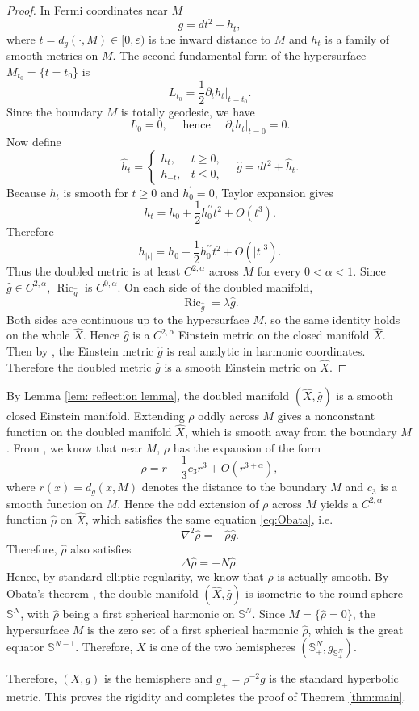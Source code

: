\documentclass[11pt,letterpaper]{amsart}
\theoremstyle{definition}
\theoremstyle{remark}
\numberwithin{equation}{section}
\newcommand{\Sph}{\mathbb S}
\newcommand{\Ric}{\operatorname{Ric}}
\begin{document}
\begin{proof}
In Fermi coordinates near $M$
\[
g=d t^2+h_t,
\]
where $t=d_g(\cdot, M) \in [0,\varepsilon)$ is the inward distance to $M$ and $h_t$ is a  family of smooth metrics on $M$. The second fundamental form of the hypersurface $M_{t_0}=\{t=t_0$\} is
\[
L_{t_0}=\frac{1}{2} \partial_t h_t|_{t=t_0}.
\]
Since the boundary $M$ is totally geodesic, we have
\[
L_0=0, \quad \text { hence }\left.\quad \partial_t h_t\right|_{t=0}=0.
\]
Now define
\[
\widehat{h}_t=\left\{\begin{array}{ll}
h_t, & t \geq 0, \\
h_{-t}, & t \leq 0,
\end{array} \quad \widehat{g}=d t^2+\widehat{h}_t\right..
\]
Because $h_t$ is smooth for $t \geq 0$ and $h_0^{\prime}=0$, Taylor expansion gives
\[
h_t=h_0+\frac{1}{2} h_0^{\prime \prime} t^2+O\left(t^3\right) .
\]
Therefore
\[
h_{|t|}=h_0+\frac{1}{2} h_0^{\prime \prime} t^2+O\left(|t|^3\right) .
\]
Thus the doubled metric is at least $C^{2, \alpha}$ across $M$ for every $0<\alpha<1$. 
Since $\hat{g} \in C^{2, \alpha}$, $\Ric_{\hat{g}}$ is $C^{0, \alpha}$. On each side of the doubled manifold,
\[
\operatorname{Ric}_{\hat{g}}=\lambda \hat{g}.
\]
Both sides are continuous up to the hypersurface $M$, so the same identity holds on the whole $\hat{X}$. Hence $\hat{g}$ is a $C^{2, \alpha}$ Einstein metric on the closed manifold $\hat{X}$.
Then by \cite[Theorem 5.2]{DeTurckKazdan1981}, the Einstein metric $\hat{g}$ is real analytic in harmonic coordinates. Therefore the doubled metric $\hat{g}$ is a smooth Einstein metric on $\hat{X}$.
\end{proof}
By Lemma \ref{lem: reflection lemma}, the doubled manifold $(\hat{X}, \hat{g})$ is a smooth closed Einstein manifold. Extending $\rho$ oddly across $M$ gives a nonconstant function on the doubled manifold $\hat{X}$, which is smooth away from the boundary $M$. From \cite[(3.9)]{GurskyHan}, we know that near $M$, $\rho$ has the expansion of the form
\[
\rho=r-\frac{1}{3} c_3 r^3+O\left(r^{3+\alpha}\right),
\]
where $r(x)=d_{g}(x, M)$ denotes the distance to the boundary $M$ and $c_3$ is a smooth function on $M$. Hence the odd extension of $\rho$ across $M$ yields a $C^{2,\alpha}$ function $\hat{\rho}$ on $\hat{X}$, which satisfies the same equation \eqref{eq:Obata}, i.e.
\[
 \nabla^2\hat{\rho}=-\hat{\rho} \hat{g}.
\]
Therefore, $\hat{\rho}$ also satisfies
\[
\Delta \hat{\rho} =-N \hat{\rho}.
\]
Hence, by standard elliptic regularity, we know that $\hat{\rho}$ is actually smooth.
By Obata's theorem \cite{Obata}, the double manifold $(\hat{X}, \hat{g})$ is isometric to the round sphere $\Sph^N$, with $\hat{\rho}$ being a first spherical harmonic on $\Sph^N$. Since $M=\{\hat{\rho}=0\}$, the hypersurface $M$ is the zero set of a first spherical harmonic $\hat{\rho}$, which is the great equator $\mathbb{S}^{N-1}$. Therefore, $X$ is one of the two hemispheres $(\Sph_+^N, g_{\Sph_+^N})$.

Therefore, $(X,g)$ is the hemisphere and $g_+=\rho^{-2}g$ is the standard hyperbolic metric.  This proves the rigidity and completes the proof of Theorem \ref{thm:main}.






\end{document}
